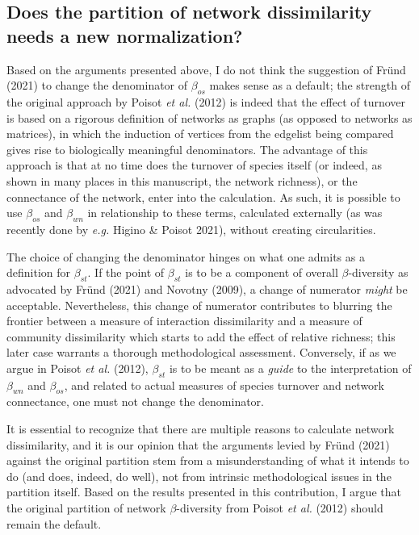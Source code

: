 \documentclass[11pt]{article}
\begin{document}
\hypertarget{does-the-partition-of-network-dissimilarity-needs-a-new-normalization}{%
\subsection{Does the partition of network dissimilarity needs a new
normalization?}\label{does-the-partition-of-network-dissimilarity-needs-a-new-normalization}}

Based on the arguments presented above, I do not think the suggestion of
Fründ (2021) to change the denominator of \(\beta_{os}\) makes sense as
a default; the strength of the original approach by Poisot \emph{et al.}
(2012) is indeed that the effect of turnover is based on a rigorous
definition of networks as graphs (as opposed to networks as matrices),
in which the induction of vertices from the edgelist being compared
gives rise to biologically meaningful denominators. The advantage of
this approach is that at no time does the turnover of species itself (or
indeed, as shown in many places in this manuscript, the network
richness), or the connectance of the network, enter into the
calculation. As such, it is possible to use \(\beta_{os}\) and
\(\beta_{wn}\) in relationship to these terms, calculated externally (as
was recently done by \emph{e.g.} Higino \& Poisot 2021), without
creating circularities.

The choice of changing the denominator hinges on what one admits as a
definition for \(\beta_{st}\). If the point of \(\beta_{st}\) is to be a
component of overall \(\beta\)-diversity as advocated by Fründ (2021)
and Novotny (2009), a change of numerator \emph{might} be acceptable.
Nevertheless, this change of numerator contributes to blurring the
frontier between a measure of interaction dissimilarity and a measure of
community dissimilarity which starts to add the effect of relative
richness; this later case warrants a thorough methodological assessment.
Conversely, if as we argue in Poisot \emph{et al.} (2012),
\(\beta_{st}\) is to be meant as a \emph{guide} to the interpretation of
\(\beta_{wn}\) and \(\beta_{os}\), and related to actual measures of
species turnover and network connectance, one must not change the
denominator.

It is essential to recognize that there are multiple reasons to
calculate network dissimilarity, and it is our opinion that the
arguments levied by Fründ (2021) against the original partition stem
from a misunderstanding of what it intends to do (and does, indeed, do
well), not from intrinsic methodological issues in the partition itself.
Based on the results presented in this contribution, I argue that the
original partition of network \(\beta\)-diversity from Poisot \emph{et
al.} (2012) should remain the default.
\end{document}
